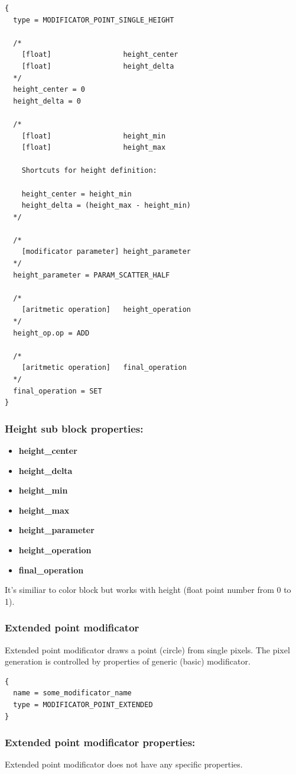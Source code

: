 \documentclass[9pt]{article}
\begin{document}
\begin{verbatim}
{
  type = MODIFICATOR_POINT_SINGLE_HEIGHT

  /*    
    [float]                 height_center
    [float]                 height_delta
  */
  height_center = 0
  height_delta = 0

  /*
    [float]                 height_min
    [float]                 height_max
    
    Shortcuts for height definition:

    height_center = height_min
    height_delta = (height_max - height_min)
  */
  
  /*
    [modificator parameter] height_parameter
  */  
  height_parameter = PARAM_SCATTER_HALF
  
  /*  
    [aritmetic operation]   height_operation
  */
  height_op.op = ADD
  
  /*  
    [aritmetic operation]   final_operation
  */
  final_operation = SET
}
\end{verbatim}
\subsubsection*{Height sub block properties:}
\begin{itemize}
\item{\bf height\_center}
\item{\bf height\_delta}
\item{\bf height\_min}
\item{\bf height\_max}
\item{\bf height\_parameter}
\item{\bf height\_operation}
\item{\bf final\_operation}
\end{itemize}
It's similiar to color block but works with height (float point number
from 0 to 1).

\subsubsection{Extended point modificator}

Extended point modificator draws a point (circle)
from single pixels. The pixel generation is controlled by 
properties of generic (basic) modificator.
\begin{verbatim}
{
  name = some_modificator_name
  type = MODIFICATOR_POINT_EXTENDED
}
\end{verbatim}
\subsubsection*{Extended point modificator properties:}
Extended point modificator does not have any specific properties.
\end{document}
